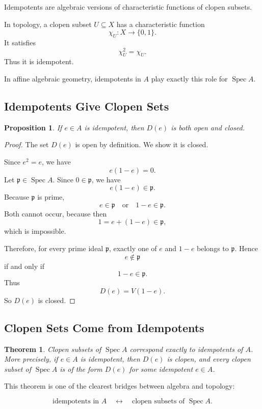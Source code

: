 \documentclass[12pt,a4paper]{article}
\newtheorem{theorem}{Theorem}[section]
\newtheorem{proposition}{Proposition}[section]
\newcommand{\Spec}{\operatorname{Spec}}
\newcommand{\mfp}{\mathfrak p}
\begin{document}
Idempotents are algebraic versions of characteristic functions of clopen
subsets.

In topology, a clopen subset \(U\subseteq X\) has a characteristic function
\[
\chi_U:X\to\{0,1\}.
\]
It satisfies
\[
\chi_U^2=\chi_U.
\]
Thus it is idempotent.

In affine algebraic geometry, idempotents in \(A\) play exactly this role for
\(\Spec A\).

\subsection{Idempotents Give Clopen Sets}

\begin{proposition}
	If \(e\in A\) is idempotent, then \(D(e)\) is both open and closed.
\end{proposition}

\begin{proof}
	The set \(D(e)\) is open by definition. We show it is closed.
	
	Since \(e^2=e\), we have
	\[
	e(1-e)=0.
	\]
	Let \(\mfp\in\Spec A\). Since \(0\in\mfp\), we have
	\[
	e(1-e)\in\mfp.
	\]
	Because \(\mfp\) is prime,
	\[
	e\in\mfp
	\quad\text{or}\quad
	1-e\in\mfp.
	\]
	Both cannot occur, because then
	\[
	1=e+(1-e)\in\mfp,
	\]
	which is impossible.
	
	Therefore, for every prime ideal \(\mfp\), exactly one of \(e\) and \(1-e\)
	belongs to \(\mfp\). Hence
	\[
	e\notin\mfp
	\]
	if and only if
	\[
	1-e\in\mfp.
	\]
	Thus
	\[
	D(e)=V(1-e).
	\]
	So \(D(e)\) is closed.
\end{proof}

\subsection{Clopen Sets Come from Idempotents}

\begin{theorem}
	Clopen subsets of \(\Spec A\) correspond exactly to idempotents of \(A\).
	More precisely, if \(e\in A\) is idempotent, then \(D(e)\) is clopen, and every
	clopen subset of \(\Spec A\) is of the form \(D(e)\) for some idempotent
	\(e\in A\).
\end{theorem}

This theorem is one of the clearest bridges between algebra and topology:

\[
\boxed{
	\text{idempotents in }A
	\quad\longleftrightarrow\quad
	\text{clopen subsets of }\Spec A.
}
\]
\end{document}
